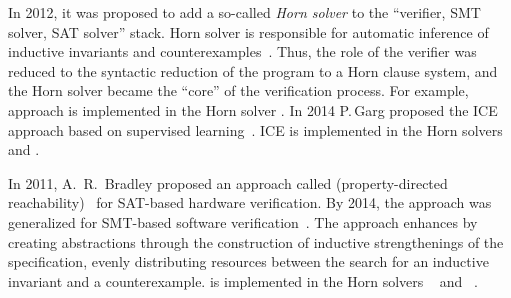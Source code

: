 In 2012, it was proposed to add a so-called \emph{Horn solver} to the ``verifier, SMT solver, SAT solver'' stack. Horn solver is responsible for automatic inference of inductive invariants and counterexamples~\cite{10.1145/2254064.2254112}.
Thus, the role of the verifier was reduced to the syntactic reduction of the program to a Horn clause system, and the Horn solver became the ``core'' of the verification process.
For example, \cegar{} approach is implemented in the Horn solver \eldarica{}.
In 2014 P.\,Garg proposed the ICE approach based on supervised learning~\cite{10.1007/978-3-319-08867-9_5}.
ICE is implemented in the Horn solvers \hoice{} and \rchc{}.

In 2011, A.~R.~Bradley proposed an approach called \pdr{} (property-directed reachability)~\cite{10.1007/978-3-642-18275-4_7} for SAT-based hardware verification. By 2014, the approach was generalized for SMT-based software verification~\cite{10.1007/978-3-642-54862-8_4,10.1007/978-3-642-31612-8_13}. The \pdr{} approach enhances \cegar{} by creating abstractions through the construction of inductive strengthenings of the specification, evenly distributing resources between the search for an inductive invariant and a counterexample. \pdr{} is implemented in the Horn solvers \spacer{}~\cite{komuravelli2016smt} and \racer{}~\cite{10.1145/3498722}.

